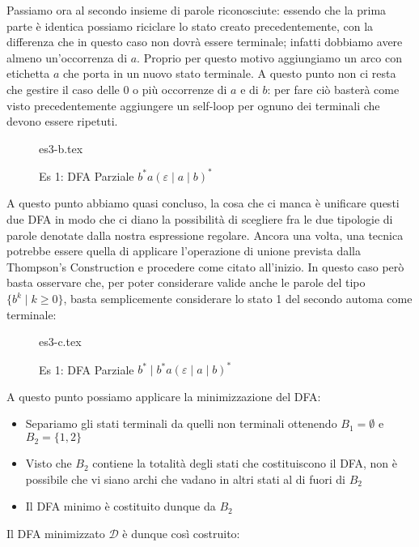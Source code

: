 \documentclass[class=book, crop=false, oneside, 12pt]{standalone}
\begin{document}
Passiamo ora al secondo insieme di parole riconosciute: essendo che la prima parte è identica possiamo riciclare lo stato creato precedentemente, con la differenza che in questo caso non dovrà essere terminale; infatti dobbiamo avere almeno un'occorrenza di \(a\). Proprio per questo motivo aggiungiamo un arco con etichetta \(a\) che porta in un nuovo stato terminale. A questo punto non ci resta che gestire il caso delle 0 o più occorrenze di \(a\) e di \(b\): per fare ciò basterà come visto precedentemente aggiungere un self-loop per ognuno dei terminali che devono essere ripetuti.


\begin{figure}[H]
	\centering
    {es3-b.tex}
    \caption{Es 1: DFA Parziale \(b^* a (\varepsilon \mid a \mid b)^*\)}
    \label{fig:dfa-pt2-ex3}
\end{figure}

A questo punto abbiamo quasi concluso, la cosa che ci manca è unificare questi due DFA in modo che ci diano la possibilità di scegliere fra le due tipologie di parole denotate dalla nostra espressione regolare. Ancora una volta, una tecnica potrebbe essere quella di applicare l'operazione di unione prevista dalla Thompson's Construction e procedere come citato all'inizio. In questo caso però basta osservare che, per poter considerare valide anche le parole del tipo \(\{b^k \mid k \geq 0\}\), basta semplicemente considerare lo stato 1 del secondo automa come terminale: 

\begin{figure}[H]
	\centering
    {es3-c.tex}
    \caption{Es 1: DFA Parziale \(b^* \mid b^* a (\varepsilon \mid a \mid b)^*\)}
    \label{fig:dfa-pt3-ex3}
\end{figure}

A questo punto possiamo applicare la minimizzazione del DFA:

\begin{itemize}
    \item Separiamo gli stati terminali da quelli non terminali ottenendo \(B_1 = \emptyset\) e  \(B_2 = \{1, 2\}\)
    \item Visto che \(B_2\) contiene la totalità degli stati che costituiscono il DFA, non è possibile che vi siano archi che vadano in altri stati al di fuori di \(B_2\)
    \item Il DFA minimo è costituito dunque da \(B_2\)
\end{itemize}

Il DFA minimizzato \(\mathcal{D}\) è dunque così costruito:
\end{document}
